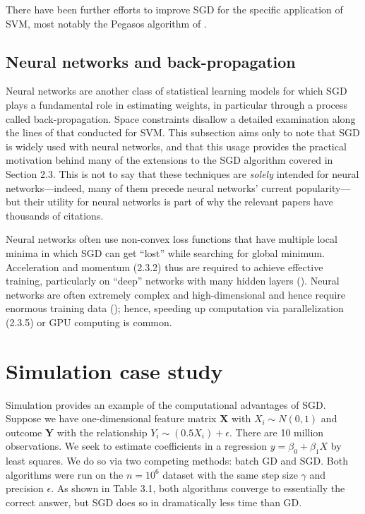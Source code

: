 \documentclass{report}
\begin{document}
There have been further efforts to improve SGD for the specific application of
SVM, most notably the Pegasos algorithm of \cite{shalev2011pegasos}.

\subsection{Neural networks and back-propagation}

Neural networks are another class of statistical learning
models for which SGD plays a fundamental role in estimating weights, in
particular through a process called back-propagation. Space
constraints disallow a detailed examination along the lines of that conducted
for SVM. This subsection aims only to note that SGD is widely used with neural
networks, and that this usage provides the practical motivation behind many of
the extensions to the SGD algorithm covered in Section 2.3. This is not to say
that these techniques are \textit{solely} intended for neural networks---indeed,
many of them precede neural networks' current popularity---but
their utility for neural networks is part of why the relevant papers have
thousands of citations.

Neural networks
often use non-convex loss functions that have multiple local minima in
which SGD can get ``lost'' while searching for global minimum.
Acceleration and momentum (2.3.2) thus are required to achieve effective
training, particularly on ``deep'' networks with many hidden layers
(\cite{sutskever2013importance}). Neural networks are
often extremely complex and high-dimensional and hence require enormous training
data (\cite{lecun2015deep}); hence, speeding up computation via parallelization
(2.3.5) or GPU computing is common. 

\section{Simulation case study}

Simulation provides an example of the computational advantages of SGD. 
Suppose we have one-dimensional feature matrix $\bm{X}$ with $X_i \sim N(0, 1)$ 
and outcome $\bm{Y}$ with the
relationship $Y_i \sim (0.5 X_i) + \epsilon$. There are 10 million observations.
We seek to estimate coefficients in a regression $y = \beta_0 + \beta_1 X$ by least
squares. We do so via two competing methods: batch GD and SGD.
Both algorithms were run on the $n=10^6$ dataset with the same step size
$\gamma$ and precision $\epsilon$. As shown in Table 3.1, both algorithms 
converge to essentially the correct answer, but SGD does so in dramatically less time than GD. 
\end{document}

